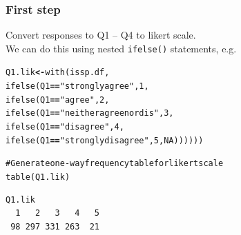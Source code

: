 \documentclass{beamer}\usepackage[]{graphicx}\usepackage[]{color}
\makeatletter
\newcommand{\hlnum}[1]{\textcolor[rgb]{0.533,0,0.133}{#1}}%
\newcommand{\hlstr}[1]{\textcolor[rgb]{0.667,0.267,0}{#1}}%
\newcommand{\hlcom}[1]{\textcolor[rgb]{1,0.533,0}{#1}}%
\newcommand{\hlopt}[1]{\textcolor[rgb]{0,0,0}{\textbf{#1}}}%
\newcommand{\hlstd}[1]{\textcolor[rgb]{0,0,0}{#1}}%
\newcommand{\hlkwb}[1]{\textcolor[rgb]{0,0,0.4}{\textbf{#1}}}%
\newcommand{\hlkwd}[1]{\textcolor[rgb]{0,0.267,0.4}{#1}}%
\newenvironment{kframe}{%
 \def\at@end@of@kframe{}%
 \ifinner\ifhmode%
  \def\at@end@of@kframe{\end{minipage}}%
  \begin{minipage}{\columnwidth}%
 \fi\fi%
 \def\FrameCommand##1{\hskip\@totalleftmargin \hskip-\fboxsep
 \colorbox{shadecolor}{##1}\hskip-\fboxsep
     \hskip-\linewidth \hskip-\@totalleftmargin \hskip\columnwidth}%
 \MakeFramed {\advance\hsize-\width
   \@totalleftmargin\z@ \linewidth\hsize
   \@setminipage}}%
 {\par\unskip\endMakeFramed%
 \at@end@of@kframe}
\newenvironment{knitrout}{}{} %
\makeatother
\begin{document}
\begin{frame}[fragile]
\frametitle{First step}
Convert responses to Q1 -- Q4 to likert scale.\\
\vspace{2mm}
We can do this using nested \texttt{ifelse()} statements, e.g.
\vspace{-2mm}
\begin{knitrout}
\color{fgcolor}\begin{kframe}
\begin{alltt}
\hlstd{Q1.lik}\hlkwb{<-} \hlkwd{with}\hlstd{(issp.df,}
            \hlkwd{ifelse}\hlstd{(Q1} \hlopt{==} \hlstr{"strongly agree"}\hlstd{,} \hlnum{1}\hlstd{,}
            \hlkwd{ifelse}\hlstd{(Q1} \hlopt{==} \hlstr{"agree"}\hlstd{,} \hlnum{2}\hlstd{,}
            \hlkwd{ifelse}\hlstd{(Q1} \hlopt{==} \hlstr{"neither agree nor dis"}\hlstd{,} \hlnum{3}\hlstd{,}
            \hlkwd{ifelse}\hlstd{(Q1} \hlopt{==} \hlstr{"disagree"}\hlstd{,} \hlnum{4}\hlstd{,}
            \hlkwd{ifelse}\hlstd{(Q1} \hlopt{==} \hlstr{"strongly disagree"}\hlstd{,} \hlnum{5}\hlstd{,} \hlnum{NA}\hlstd{))))))}
\end{alltt}
\end{kframe}
\end{knitrout}
\vspace{-2mm}
\begin{knitrout}
\color{fgcolor}\begin{kframe}
\begin{alltt}
\hlcom{# Generate one-way frequency table for likert scale}
\hlkwd{table}\hlstd{(Q1.lik)}
\end{alltt}
\end{kframe}
\end{knitrout}
\vspace{-7mm}
\begin{knitrout}
\color{fgcolor}\begin{kframe}
\begin{verbatim}
Q1.lik
  1   2   3   4   5 
 98 297 331 263  21 
\end{verbatim}
\end{kframe}
\end{knitrout}
\end{frame}
\end{document}
